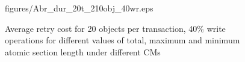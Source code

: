 \documentclass[12pt,english]{report}
\begin{document}
\begin{figure}
{{figures/Abr_dur_20t_210obj_40wr.eps}
\label{fig:20t_ecm_rcm_lcm_pnf_210obj_40wr}
}
\caption{Average retry cost for 20 objects per transaction, 40\% write operations for different values of total, maximum and minimum atomic section length under different CMs}
\label{fig:cm_20obj_per_tx_40wr}
\end{figure}
\begin{figure}
\centering

~
~
\subfigure[20 tasks]{
}
\end{figure}
\end{document}
